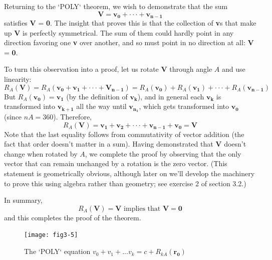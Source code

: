 \documentclass{book}
\begin{document}
Returning to the \textsc{`POLY`} theorem, we wish to demonstrate that the sum
$$\mathbf{V} = \mathbf{v_0} + \cdot \cdot \cdot + \mathbf{v_{n-1}}$$
\noindent satisfies \textbf{V} = \textbf{0}. The insight that proves this is that the collection of \textbf{v}s
that make up \textbf{V} is perfectly symmetrical. The sum of them could hardly
point in any direction favoring one \textbf{v} over another, and so must point in
no direction at all: \textbf{V} = \textbf{0}.

To turn this observation into a proof, let us rotate \textbf{V} through angle $A$
and use linearity:
$$R_A(\mathbf{V}) = R_A(\mathbf{v_0} + \mathbf{v_1} + \cdot \cdot \cdot + \mathbf{V_{n-1}}) = R_A(\mathbf{v_0}) + R_A(\mathbf{v_1}) + \cdot \cdot \cdot + R_A(\mathbf{v_{n-1}})$$
\noindent But $R_A(\mathbf{v_0}) = \mathbf{v_1}$ (by the definition of $\mathbf{v_k}$), and in general each $\mathbf{v_k}$ is
transformed into $\mathbf{v_{k+1}}$ all the way until $\mathbf{v_{n_1}}$, which gets transformed
into $\mathbf{v_0}$ (since $nA = 360$). Therefore,
$$R_A(\mathbf{V}) = \mathbf{v_1} + \mathbf{v_2} + \cdot \cdot \cdot +\mathbf{v_{n-1}} + \mathbf{v_0} = \mathbf{V} $$
Note that the last equality follows from commutativity of vector addition
(the fact that order doesn't matter in a sum).
Having demonstrated that \textbf{V} doesn't change when rotated by $A$, we
complete the proof by observing that the only vector that can remain
unchanged by a rotation is the zero vector. (This statement is geometrically obvious, although later on we'll develop the machinery to prove
this using algebra rather than geometry; see exercise 2 of section 3.2.)

In summary,
$$R_A(\mathbf{V}) = \mathbf{V} \text{ implies that } \mathbf{V} = \mathbf{0}$$
\noindent and this completes the proof of the theorem.

\begin{figure}
\begin{center}
\texttt{[image: fig3-5]}
\caption{The \textsc{`POLY`} equation $v_0 + v_1 + . . . v_k = c + R_{kA}(\mathbf{r_0})$}
\end{center}
\end{figure}
\end{document}
